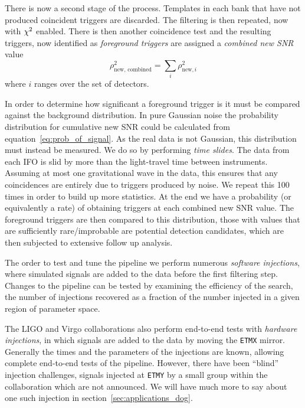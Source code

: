 There is now a second stage of the process.  Templates in each bank
that have not produced coincident triggers are discarded.  The
filtering is then repeated, now with $\chi^2$ enabled.  There is then
another coincidence test and the resulting triggers, now identified as
\emph{foreground triggers} are assigned a \emph{combined new SNR}
value
%
\begin{equation*}
\rho_{\textrm{new, combined}}^2 = \sum_i \rho_{\textrm{new}, i}^2
\end{equation*}
%
where $i$ ranges over the set of detectors.

In order to determine how significant a foreground trigger is it must
be compared against the background distribution.  In pure Gaussian
noise the probability distribution for cumulative new SNR could be
calculated from equation~\ref{eq:prob_of_signal}.  As the real data is
not Gaussian, this distribution must instead be measured.  We do so by
performing \emph{time slides}.  The data from each IFO is slid by more
than the light-travel time between instruments.  Assuming at most one
gravitational wave in the data, this ensures that any coincidences are
entirely due to triggers produced by noise.  We repeat this 100 times
in order to build up more statistics.  At the end we have a
probability (or equivalently a rate) of obtaining triggers at each
combined new SNR value.  The foreground triggers are then compared to
this distribution, those with values that are sufficiently
rare/improbable are potential detection candidates, which are then
subjected to extensive follow up analysis.

The order to test and tune the pipeline we perform numerous
\emph{software injections}, where simulated signals are added to the
data before the first filtering step.  Changes to the pipeline can be
tested by examining the efficiency of the search, the number of
injections recovered as a fraction of the number injected in a given
region of parameter space.

The LIGO and Virgo collaborations also perform end-to-end tests with
\emph{hardware injections}, in which signals are added to the data by
moving the \texttt{ETMX} mirror.  Generally the times and the
parameters of the injections are known, allowing complete end-to-end
tests of the pipeline.  However, there have been ``blind'' injection
challenges, signals injected at \texttt{ETMY} by a small group within
the collaboration which are not announced.  We will have much more to
say about one such injection in section~\ref{sec:applications_dog}.

